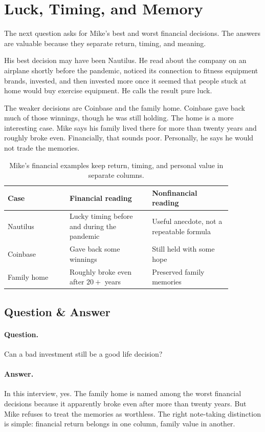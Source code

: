 \section{Luck, Timing, and Memory}

The next question asks for Mike's best and worst financial decisions. The answers are valuable because they separate return, timing, and meaning.

His best decision may have been Nautilus. He read about the company on an airplane shortly before the pandemic, noticed its connection to fitness equipment brands, invested, and then invested more once it seemed that people stuck at home would buy exercise equipment. He calls the result pure luck.

The weaker decisions are Coinbase and the family home. Coinbase gave back much of those winnings, though he was still holding. The home is a more interesting case. Mike says his family lived there for more than twenty years and roughly broke even. Financially, that sounds poor. Personally, he says he would not trade the memories.

\begin{table}
\centering
\begin{tabular}{p{0.24\linewidth}p{0.32\linewidth}p{0.31\linewidth}}
\hline
Case & Financial reading & Nonfinancial reading \\
\hline
Nautilus & Lucky timing before and during the pandemic & Useful anecdote, not a repeatable formula \\
Coinbase & Gave back some winnings & Still held with some hope \\
Family home & Roughly broke even after \(20+\) years & Preserved family memories \\
\hline
\end{tabular}
\caption{Mike's financial examples keep return, timing, and personal value in separate columns.}
\end{table}

\subsection{Question \& Answer}

\paragraph{Question.}
Can a bad investment still be a good life decision?

\paragraph{Answer.}
In this interview, yes. The family home is named among the worst financial decisions because it apparently broke even after more than twenty years. But Mike refuses to treat the memories as worthless. The right note-taking distinction is simple: financial return belongs in one column, family value in another.

